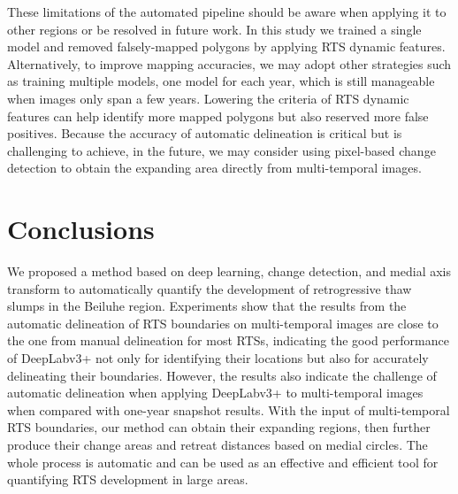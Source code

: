 \documentclass[authoryear,preprint,review,12pt]{elsarticle}
\begin{document}
These limitations of the automated pipeline should be aware when applying it to other regions or be resolved in future work. 
In this study we trained a single model and removed falsely-mapped polygons by applying RTS dynamic features.  
Alternatively, to improve mapping accuracies, we may adopt other strategies such as training multiple models, one model for each year,  which is still manageable when images only span a few years.
Lowering the criteria of RTS dynamic features can help identify more mapped polygons but also reserved more false positives.
Because the accuracy of automatic delineation is critical but is challenging to achieve, in the future, we may consider using pixel-based change detection to obtain the expanding area directly from multi-temporal images.



%





%


\section{Conclusions}
\label{sec_conclusion}

We proposed a method based on deep learning, change detection, and medial axis transform to automatically quantify the development of retrogressive thaw slumps in the Beiluhe region. 
Experiments show that the results from the automatic delineation of RTS boundaries on multi-temporal images are close to the one from manual delineation for most RTSs, indicating the good performance of DeepLabv3+ not only for identifying their locations but also for accurately delineating their boundaries. 
However, the results also indicate the challenge of automatic delineation when applying DeepLabv3+ to multi-temporal images when compared with one-year snapshot results. 
With the input of multi-temporal RTS boundaries, %
our method can obtain their expanding regions, then further produce their change areas and retreat distances based on medial circles. 
The whole process is automatic and can be used as an effective and efficient tool for quantifying RTS development in large areas. 
\end{document}
